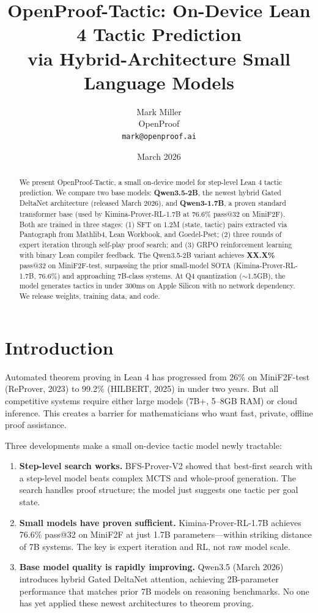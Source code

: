 \documentclass[11pt,a4paper]{article}
\title{OpenProof-Tactic: On-Device Lean 4 Tactic Prediction\\via Hybrid-Architecture Small Language Models}
\author{
Mark Miller \\
OpenProof \\
\texttt{mark@openproof.ai}
}
\date{March 2026}
\begin{document}
\maketitle

\begin{abstract}
We present OpenProof-Tactic, a small on-device model for step-level Lean 4 tactic prediction. We compare two base models: \textbf{Qwen3.5-2B}, the newest hybrid Gated DeltaNet architecture (released March 2026), and \textbf{Qwen3-1.7B}, a proven standard transformer base (used by Kimina-Prover-RL-1.7B at 76.6\% pass@32 on MiniF2F). Both are trained in three stages: (1) SFT on 1.2M (state, tactic) pairs extracted via Pantograph from Mathlib4, Lean Workbook, and Goedel-Pset; (2) three rounds of expert iteration through self-play proof search; and (3) GRPO reinforcement learning with binary Lean compiler feedback. The Qwen3.5-2B variant achieves \textbf{XX.X\%} pass@32 on MiniF2F-test, surpassing the prior small-model SOTA (Kimina-Prover-RL-1.7B, 76.6\%) and approaching 7B-class systems. At Q4 quantization ($\sim$1.5GB), the model generates tactics in under 300ms on Apple Silicon with no network dependency. We release weights, training data, and code.
\end{abstract}

\section{Introduction}
\label{sec:intro}

Automated theorem proving in Lean 4 has progressed from 26\% on MiniF2F-test (ReProver, 2023) to 99.2\% (HILBERT, 2025) in under two years. But all competitive systems require either large models (7B+, 5--8GB RAM) or cloud inference. This creates a barrier for mathematicians who want fast, private, offline proof assistance.

Three developments make a small on-device tactic model newly tractable:

\begin{enumerate}
\item \textbf{Step-level search works.} BFS-Prover-V2 \citep{bfsprover2} showed that best-first search with a step-level model beats complex MCTS and whole-proof generation. The search handles proof structure; the model just suggests one tactic per goal state.

\item \textbf{Small models have proven sufficient.} Kimina-Prover-RL-1.7B \citep{kimina} achieves 76.6\% pass@32 on MiniF2F at just 1.7B parameters---within striking distance of 7B systems. The key is expert iteration and RL, not raw model scale.

\item \textbf{Base model quality is rapidly improving.} Qwen3.5 \citep{qwen35} (March 2026) introduces hybrid Gated DeltaNet attention, achieving 2B-parameter performance that matches prior 7B models on reasoning benchmarks. No one has yet applied these newest architectures to theorem proving.
\end{enumerate}
\end{document}

